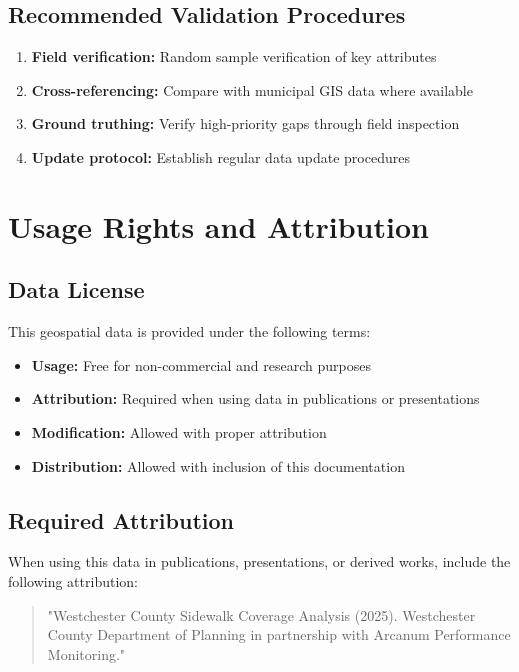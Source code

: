 \documentclass[11pt,letterpaper]{article}
\begin{document}
\subsection{Recommended Validation Procedures}

\begin{enumerate}
    \item \textbf{Field verification:} Random sample verification of key attributes
    \item \textbf{Cross-referencing:} Compare with municipal GIS data where available
    \item \textbf{Ground truthing:} Verify high-priority gaps through field inspection
    \item \textbf{Update protocol:} Establish regular data update procedures
\end{enumerate}

\section{Usage Rights and Attribution}

\subsection{Data License}

This geospatial data is provided under the following terms:
\begin{itemize}
    \item \textbf{Usage:} Free for non-commercial and research purposes
    \item \textbf{Attribution:} Required when using data in publications or presentations
    \item \textbf{Modification:} Allowed with proper attribution
    \item \textbf{Distribution:} Allowed with inclusion of this documentation
\end{itemize}

\subsection{Required Attribution}

When using this data in publications, presentations, or derived works, include the following attribution:

\begin{quote}
"Westchester County Sidewalk Coverage Analysis (2025). Westchester County Department of Planning in partnership with Arcanum Performance Monitoring."
\end{quote}
\end{document}
